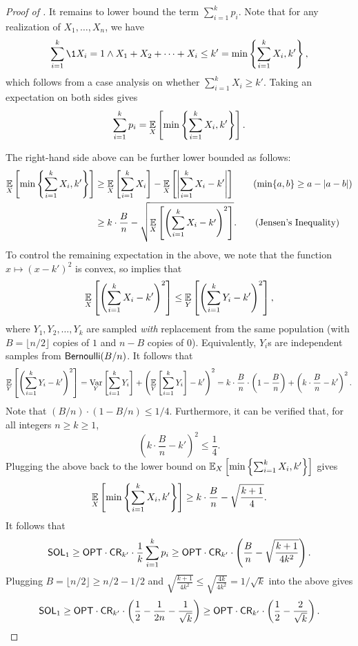 \begin{proof}[Proof of ]
It remains to lower bound the term $\sum_{i=1}^{k}p_i$. Note that for any realization of $X_1, \ldots, X_n$, we have
\[
    \sum_{i=1}^k \1{X_i = 1 \wedge X_1 + X_2 + \cdots + X_i \le k'} = \min\left\{\sum_{i=1}^k X_i, k'\right\},
\]
which follows from a case analysis on whether $\sum_{i=1}^k X_i \ge k'$. Taking an expectation on both sides gives
\[
    \sum_{i=1}^k p_i
=   \operatorname*{\mathbb{E}}_{X}\left[\min\left\{\sum_{i=1}^{k}X_i, k'\right\}\right].
\]

The right-hand side above can be further lower bounded as follows:
\begin{align*}
        \Ex{X}{\min\left\{\sum_{i=1}^k X_i, k'\right\}}
&\ge    \Ex{X}{\sum_{i=1}^k X_i} - \Ex{X}{\left|\sum_{i=1}^k X_i - k'\right|} \tag{$\min\{a, b\} \ge a - |a-b|$}\\
&\ge    k\cdot \frac{B}{n} - \sqrt{\Ex{X}{\left(\sum_{i=1}^kX_i - k'\right)^2}}. \tag{Jensen's Inequality}
\end{align*}
To control the remaining expectation in the above, we note that the function $x \mapsto (x - k')^2$ is convex, so  implies that
\[
    \operatorname*{\mathbb{E}}_{X}\left[\left(\sum_{i=1}^kX_i - k'\right)^2\right]
\le \operatorname*{\mathbb{E}}_{Y}\left[\left(\sum_{i=1}^kY_i - k'\right)^2\right],
\]
where $Y_1, Y_2, \ldots, Y_k$ are sampled \emph{with} replacement from the same population (with $B = \lfloor n/2\rfloor$ copies of $1$ and $n - B$ copies of $0$). Equivalently, $Y_i$s are independent samples from $\mathsf{Bernoulli}(B / n)$. It follows that
\[
    \operatorname*{\mathbb{E}}_{Y}\left[\left(\sum_{i=1}^kY_i - k'\right)^2\right]
=   \operatorname*{\mathrm{Var}}_{Y}\left[\sum_{i=1}^kY_i\right] + \left(\operatorname*{\mathbb{E}}_{Y}\left[\sum_{i=1}^kY_i\right] - k'\right)^2
=   k\cdot\frac{B}{n}\cdot\left(1 - \frac{B}{n}\right) + \left(k\cdot \frac{B}{n} - k'\right)^2.
\]
Note that $(B/n)\cdot (1 - B/n) \le 1/4$. Furthermore, it can be verified that, for all integers $n \ge k \ge 1$,
\[
    \left(k\cdot \frac{B}{n} - k'\right)^2 \le \frac{1}{4}.
\]
Plugging the above back to the lower bound on $\operatorname*{\mathbb{E}}_{X}\left[\min\left\{\sum_{i=1}^{k}X_i, k'\right\}\right]$ gives
\[
    \operatorname*{\mathbb{E}}_{X}\left[\min\left\{\sum_{i=1}^{k}X_i, k'\right\}\right]
\ge k\cdot\frac{B}{n} - \sqrt{\frac{k+1}{4}}.
\]
It follows that
\[
    \mathsf{SOL}_1
\ge \mathsf{OPT}\cdot \mathsf{CR}_{k'} \cdot \frac{1}{k}\sum_{i=1}^{k}p_i
\ge \mathsf{OPT}\cdot\mathsf{CR}_{k'}\cdot \left(\frac{B}{n} - \sqrt{\frac{k+1}{4k^2}}\right).
\]
Plugging $B = \lfloor n / 2\rfloor \ge n / 2 - 1/2$ and $\sqrt{\frac{k+1}{4k^2}} \le \sqrt{\frac{4k}{4k^2}} = 1 / \sqrt{k}$ into the above gives
\begin{equation}\label{eq:SOL-1-bound}
    \mathsf{SOL}_1
\ge \mathsf{OPT}\cdot\mathsf{CR}_{k'}\cdot \left(\frac{1}{2} - \frac{1}{2n} - \frac{1}{\sqrt{k}}\right)
\ge \mathsf{OPT}\cdot\mathsf{CR}_{k'}\cdot \left(\frac{1}{2} - \frac{2}{\sqrt{k}}\right).
\end{equation}


\end{proof}
